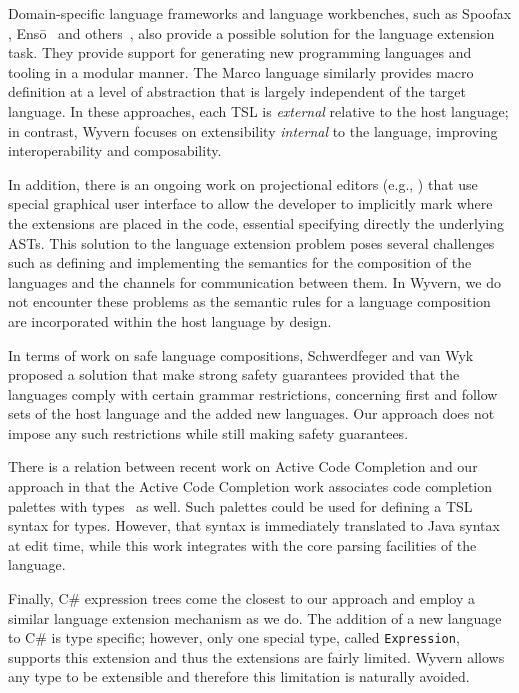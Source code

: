 Domain-specific language frameworks and language workbenches, such as Spoofax \cite{KatsVisser2010}, Ens\={o}~\cite{enso} and others~\cite{krahn2008monticore,van1992pregmatic}, also provide a possible solution for the language extension task. They provide support for generating new programming languages and tooling in a modular manner.  The Marco language \cite{lee:2012:marco} similarly provides macro definition at a level of abstraction that is largely independent of the target language. In these approaches, each TSL is \emph{external} relative to the host language; in contrast, Wyvern focuses on extensibility \emph{internal} to the language, improving interoperability and composability.

In addition, there is an ongoing work on projectional editors (e.g., \cite{mps,Diekmann:2013}) that use special graphical user interface to allow the developer to implicitly mark where the extensions are placed in the code, essential specifying directly the underlying ASTs. This solution to the language extension problem poses several challenges such as defining and implementing the semantics for the composition of the languages and the channels for communication between them. In Wyvern, we do not encounter these problems as the semantic rules for a language composition are incorporated within the host language by design.

In terms of work on safe language compositions, Schwerdfeger and van Wyk~\cite{safecompositionvanwyk} proposed a solution that make strong safety guarantees provided that the languages comply with certain grammar restrictions, concerning first and follow sets of the host language and the added new languages. Our approach does not impose any such restrictions while still making safety guarantees.

There is a relation between recent work on Active Code Completion and our approach in that
the Active Code Completion work associates code completion palettes with types~\cite{omar2012active} as well. Such palettes could be used for defining a TSL syntax for types. However, that syntax
is immediately translated to Java syntax at edit time, while this work
integrates with the core parsing facilities of the language.

Finally, C\# expression trees \cite{Csharp} come the closest to our approach and employ a similar language extension mechanism as we do. The addition of a new language to C\# is type specific; however, only one special type, called \lstinline{Expression}, supports this extension and thus the extensions are fairly limited. Wyvern allows any type to be extensible and therefore this limitation is naturally avoided.



